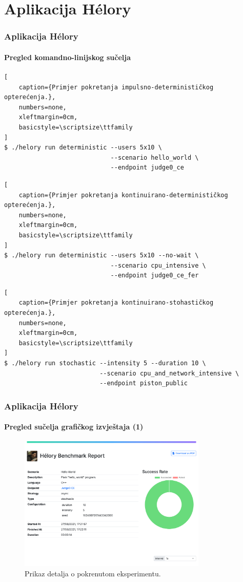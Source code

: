 \documentclass{beamer}
\newif\ifplacelogo
\begin{document}
\section{Aplikacija Hélory}
\begin{frame}[fragile]
\frametitle{Aplikacija Hélory}
\framesubtitle{Pregled komandno-linijskog sučelja}
\begin{lstlisting}[
	caption={Primjer pokretanja impulsno-determinističkog opterećenja.},
	numbers=none,
	xleftmargin=0cm,
	basicstyle=\scriptsize\ttfamily
]
$ ./helory run deterministic --users 5x10 \
                             --scenario hello_world \
                             --endpoint judge0_ce
\end{lstlisting}

\begin{lstlisting}[
	caption={Primjer pokretanja kontinuirano-determinističkog opterećenja.},
	numbers=none,
	xleftmargin=0cm,
	basicstyle=\scriptsize\ttfamily
]
$ ./helory run deterministic --users 5x10 --no-wait \
                             --scenario cpu_intensive \
                             --endpoint judge0_ce_fer
\end{lstlisting}

\begin{lstlisting}[
	caption={Primjer pokretanja kontinuirano-stohastičkog opterećenja.},
	numbers=none,
	xleftmargin=0cm,
	basicstyle=\scriptsize\ttfamily
]
$ ./helory run stochastic --intensity 5 --duration 10 \
                          --scenario cpu_and_network_intensive \
                          --endpoint piston_public
\end{lstlisting}
\end{frame}
\placelogotrue

\placelogofalse
\begin{frame}
\frametitle{Aplikacija Hélory}
\framesubtitle{Pregled sučelja grafičkog izvještaja (1)}
\begin{figure}[htb]
	\centering
	\includegraphics[width=0.8\textwidth]{images/Report UI 1.png}
	\caption{
		Prikaz detalja o pokrenutom eksperimentu.
	}
\end{figure}
\end{frame}
\placelogotrue
\end{document}

